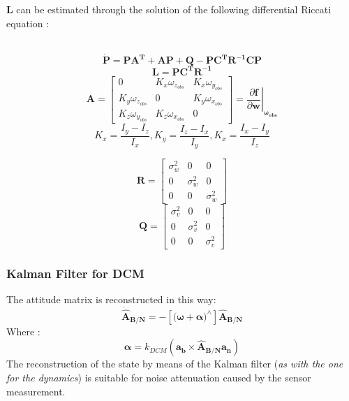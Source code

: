 \documentclass[11pt]{article}
\begin{document}
 $ \mathbf{L}$ can be estimated through the solution of the following differential Riccati equation \cite{riccati}:\\\\
 \begin{minipage}{.5 \textwidth}
 \begin{equation}
    \mathbf{\dot{P} = PA^T + AP + Q - PC^T R^{-1} CP}
 \end{equation}
 \begin{equation}
     \mathbf{ L = PC^T R^{-1}}
 \end{equation}
 \begin{equation}
     \mathbf{A}=\begin{bmatrix}
     0 & K_x\omega_{z_{obs}} & K_x\omega_{y_{obs}} \\ K_y\omega_{z_{obs}}  & 0 & K_y\omega_{x_{obs}} \\ K_z\omega_{y_{obs}}  & K_z\omega_{x_{obs}}  & 0
     \end{bmatrix}= \left. \frac{\partial \mathbf{f}}{\partial\boldsymbol{w}} \right|_{\boldsymbol{\omega_{obs}}}
 \end{equation}
 \begin{equation}
    K_x = \frac{I_y-I_z}{I_x},  K_y = \frac{I_z-I_x}{I_y},  K_x = \frac{I_x-I_y}{I_z}
 \end{equation}
 \end{minipage}
  \begin{minipage}{.5 \textwidth}
 
 
 \begin{equation}
     \mathbf{ R }= \begin{bmatrix}
     \sigma_w^2 &0 &0\\
     0&   \sigma_w^2& 0 \\
     0& 0 & \sigma_w^2
     \end{bmatrix}
 \end{equation}
\begin{equation}
     \mathbf{ Q }= \begin{bmatrix}
     \sigma_v^2 &0 &0\\
     0&   \sigma_v^2& 0 \\
     0& 0 & \sigma_v^2
     \end{bmatrix}
\end{equation}
 \end{minipage}
 \subsubsection{Kalman Filter for DCM}
 The attitude matrix is reconstructed in this way:
 \begin{equation}
     \mathbf{\dot{\hat{A}}_{B/N}}=-[(\boldsymbol{\omega+\alpha)}^\wedge]\mathbf{\hat{A}_{B/N}}
 \end{equation}
 Where :
 \begin{equation}
     \boldsymbol{\alpha}=k_{DCM}(\mathbf{a_b \times \hat{A}_{B/N}a_n})
 \end{equation}
 The reconstruction of the state by means of the Kalman filter (\textit{as with the one for the dynamics}) is suitable for noise attenuation caused by the sensor measurement.
\end{document}
